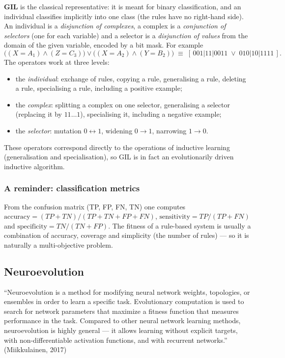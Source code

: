 \documentclass[11pt,a4paper]{article}
\theoremstyle{definition}
\providecommand{\uv}[1]{``#1''}
\begin{document}
\textbf{GIL} is the classical representative: it is meant for binary
classification, and an individual classifies implicitly into one class (the
rules have no right-hand side). An individual is a \emph{disjunction of
complexes}, a complex is a \emph{conjunction of selectors} (one for each
variable) and a selector is a \emph{disjunction of values} from the domain of
the given variable, encoded by a bit mask. For example
\[
\big((X{=}A_1) \wedge (Z{=}C_3)\big) \vee \big((X{=}A_2) \wedge (Y{=}B_2)\big)
\;\equiv\;
[\,001|11|0011 \;\vee\; 010|10|1111\,].
\]
The operators work at three levels:
\begin{itemize}
\item the \emph{individual}: exchange of rules, copying a rule, generalising a
  rule, deleting a rule, specialising a rule, including a positive example;
\item the \emph{complex}: splitting a complex on one selector, generalising a
  selector (replacing it by $11\ldots1$), specialising it, including a negative
  example;
\item the \emph{selector}: mutation $0 \leftrightarrow 1$, widening $0 \to 1$,
  narrowing $1 \to 0$.
\end{itemize}
These operators correspond directly to the operations of inductive learning
(generalisation and specialisation), so GIL is in fact an evolutionarily driven
inductive algorithm.

\subsubsection{A reminder: classification metrics}

From the confusion matrix (TP, FP, FN, TN) one computes
$\text{accuracy} = (TP+TN)/(TP+TN+FP+FN)$,
$\text{sensitivity} = TP/(TP+FN)$ and $\text{specificity} = TN/(TN+FP)$.
The fitness of a rule-based system is usually a combination of accuracy, coverage and
simplicity (the number of rules) --- so it is naturally a multi-objective problem.

\subsection{Neuroevolution}
\label{sec:neuro}

\begin{defbox}[Neuroevolution]
\uv{Neuroevolution is a method for modifying neural network weights, topologies,
or ensembles in order to learn a specific task. Evolutionary computation is used
to search for network parameters that maximize a fitness function that measures
performance in the task. Compared to other neural network learning methods,
neuroevolution is highly general --- it allows learning without explicit
targets, with non-differentiable activation functions, and with recurrent
networks.} (Miikkulainen, 2017)
\end{defbox}
\end{document}
